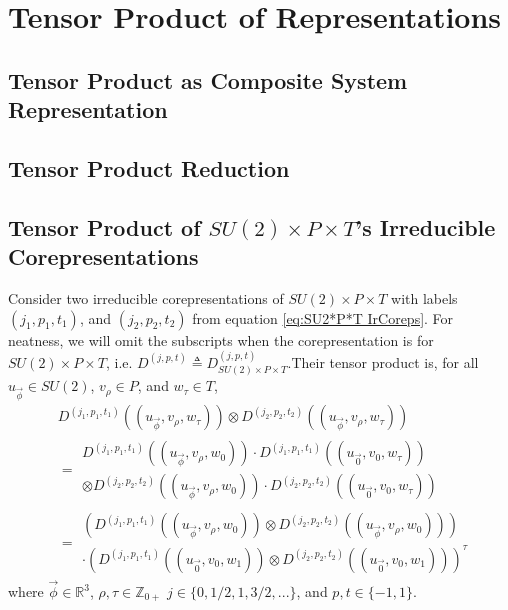 \documentclass[preprint, 12pt]{revtex4-2}
\numberwithin{equation}{section}
\begin{document}
\newpage
\section{Tensor Product of Representations}

\subsection{Tensor Product as Composite System Representation}

\subsection{Tensor Product Reduction}

\subsection{Tensor Product of $SU(2)\times P\times T$'s Irreducible Corepresentations}
Consider two irreducible corepresentations of $SU(2)\times P\times T$ with labels $(j_1, p_1, t_1)$, and $(j_2, p_2, t_2)$ from equation \ref{eq:SU2*P*T IrCoreps}. For neatness, we will omit the subscripts when the corepresentation is for $SU(2)\times P\times T$, i.e. $D^{(j,p,t)}\triangleq D^{(j,p,t)}_{SU(2)\times P\times T}$.Their tensor product is, for all $u_{\vec{\phi}}\in SU(2)$, $v_\rho \in P$, and $w_\tau \in T$,
\begin{equation}
    \begin{aligned}
        &D^{(j_1,p_1,t_1)}((u_{\vec{\phi}}, v_\rho, w_\tau))\otimes D^{(j_2,p_2,t_2)}((u_{\vec{\phi}}, v_\rho, w_\tau)) \\
        &=  \begin{multlined}
                D^{(j_1,p_1,t_1)}((u_{\vec{\phi}}, v_\rho, w_0))\cdot D^{(j_1,p_1,t_1)}((u_{\vec{0}}, v_0, w_\tau))\\ 
                \otimes D^{(j_2,p_2,t_2)}((u_{\vec{\phi}}, v_\rho, w_0))\cdot D^{(j_2,p_2,t_2)}((u_{\vec{0}}, v_0, w_\tau))
            \end{multlined} \\
        &=  \begin{multlined}
                \left(D^{(j_1,p_1,t_1)}((u_{\vec{\phi}}, v_\rho, w_0)) \otimes D^{(j_2,p_2,t_2)}((u_{\vec{\phi}}, v_\rho, w_0))\right) \\
                \cdot \left(D^{(j_1,p_1,t_1)}((u_{\vec{0}}, v_0, w_1)) \otimes D^{(j_2,p_2,t_2)}((u_{\vec{0}}, v_0, w_1))\right)^\tau
            \end{multlined}
    \end{aligned}
\end{equation}
where $\vec{\phi}\in\mathbb{R}^3$, $\rho,\tau\in\mathbb{Z}_{0+}$ $j\in\{0, 1/2, 1, 3/2, ...\}$, and $p, t\in\{-1, 1\}$. 
\end{document}
